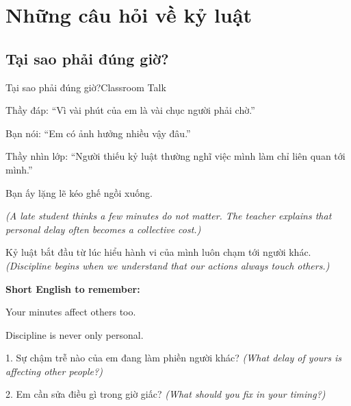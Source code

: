 \chapter{Những câu hỏi về kỷ luật}

\section{Tại sao phải đúng giờ?}
\begin{truyen}{Tại sao phải đúng giờ?}{Classroom Talk}

Thầy đáp: ``Vì vài phút của em là vài chục người phải chờ.''

Bạn nói: ``Em có ảnh hưởng nhiều vậy đâu.''

Thầy nhìn lớp: ``Người thiếu kỷ luật thường nghĩ việc mình làm chỉ liên quan tới mình.''

Bạn ấy lặng lẽ kéo ghế ngồi xuống.

\textit{(A late student thinks a few minutes do not matter. The teacher explains that personal delay often becomes a collective cost.)}
\end{truyen}

\begin{baihoc}
Kỷ luật bắt đầu từ lúc hiểu hành vi của mình luôn chạm tới người khác.
\textit{(Discipline begins when we understand that our actions always touch others.)}
\end{baihoc}

\begin{ghinhoanh}
\textbf{Short English to remember:}

Your minutes affect others too.

Discipline is never only personal.
\end{ghinhoanh}

\begin{tuhocnhanh}
1. Sự chậm trễ nào của em đang làm phiền người khác? \textit{(What delay of yours is affecting other people?)}

2. Em cần sửa điều gì trong giờ giấc? \textit{(What should you fix in your timing?)}
\end{tuhocnhanh}
\ngancach

